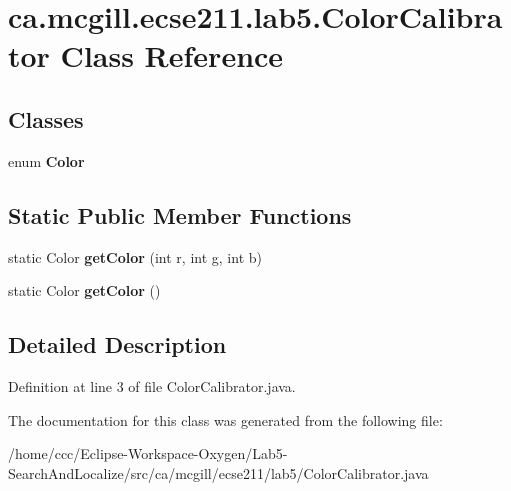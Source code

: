 \hypertarget{classca_1_1mcgill_1_1ecse211_1_1lab5_1_1_color_calibrator}{}\section{ca.\+mcgill.\+ecse211.\+lab5.\+Color\+Calibrator Class Reference}
\label{classca_1_1mcgill_1_1ecse211_1_1lab5_1_1_color_calibrator}
\subsection*{Classes}
\begin{DoxyCompactItemize}
\item 
enum {\bfseries Color}
\end{DoxyCompactItemize}
\subsection*{Static Public Member Functions}
\begin{DoxyCompactItemize}
\item 
\mbox{\label{classca_1_1mcgill_1_1ecse211_1_1lab5_1_1_color_calibrator_a115188f4d3b465e09db3482f8a6f25d2}} 
static Color {\bfseries get\+Color} (int r, int g, int b)
\item 
\mbox{\label{classca_1_1mcgill_1_1ecse211_1_1lab5_1_1_color_calibrator_ac6a2e41db5bd91b1356f53106178862e}} 
static Color {\bfseries get\+Color} ()
\end{DoxyCompactItemize}


\subsection{Detailed Description}


Definition at line 3 of file Color\+Calibrator.\+java.



The documentation for this class was generated from the following file\+:\begin{DoxyCompactItemize}
\item 
/home/ccc/\+Eclipse-\/\+Workspace-\/\+Oxygen/\+Lab5-\/\+Search\+And\+Localize/src/ca/mcgill/ecse211/lab5/Color\+Calibrator.\+java\end{DoxyCompactItemize}
